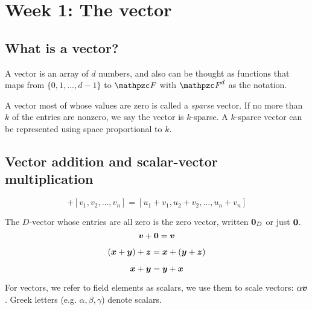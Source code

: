 \chapter{Week 1: The vector}

\section{What is a vector?}
A vector is an array of $d$ numbers, and also can be thought as functions that maps from $\{0, 1, \ldots, d-1\}$ to $\fF$ with $\fF^{d}$ as the notation.

A vector most of whose values are zero is called a \textsl{sparse} vector. If no more than $k$ of the entries are nonzero, we say the vector is $k$-sparse. A $k$-sparce vector can be represented using space proportional to $k$.

\section{Vector addition and scalar-vector multiplication}
\begin{definition}
  \begin{equation*}
    [u_1, u_2, \ldots, u_n] + [v_1, v_2, \ldots, v_n] = [u_1+v_1, u_2+v_2, \ldots, u_n+v_n]
  \end{equation*}
\end{definition}

\begin{definition}
  The $D$-vector whose entries are all zero is the zero vector, written ${\bm{0}}_D$ or just ${\bm{0}}$.
  \begin{equation*}
    {\bm{v}} + {\bm{0}} = {\bm{v}}
  \end{equation*}
\end{definition}

\begin{definition}[Associativity]
  \begin{equation*}
    ({\bm{x}} + {\bm{y}}) + {\bm{z}} = {\bm{x}} + ({\bm{y}} + {\bm{z}})
  \end{equation*}
\end{definition}

\begin{definition}[Commutativity]
  \begin{equation*}
    {\bm{x}} + {\bm{y}} = {\bm{y}} + {\bm{x}}
  \end{equation*}
\end{definition}

For vectors, we refer to field elements as scalars, we use them to scale vectors: $\alpha{\bm{v}}$. Greek letters (e.g. $\alpha,\beta,\gamma$) denote scalars.

